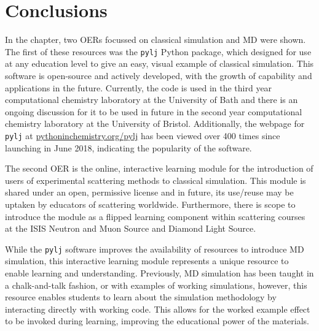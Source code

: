 \section{Conclusions}
In the chapter, two OERs focussed on classical simulation and MD were shown.
The first of these resources was the \texttt{pylj} Python package, which designed for use at any education level to give an easy, visual example of classical simulation.
This software is open-source and actively developed, with the growth of capability and applications in the future.
Currently, the code is used in the third year computational chemistry laboratory at the University of Bath and there is an ongoing discussion for it to be used in future in the second year computational chemistry laboratory at the University of Bristol.
Additionally, the webpage for \texttt{pylj} at \href{https://pythoninchemistry.org/pylj}{pythoninchemistry.org/pylj} has been viewed over 400 times since launching in June 2018, indicating the popularity of the software.

The second OER is the online, interactive learning module for the introduction of users of experimental scattering methods to classical simulation.
This module is shared under an open, permissive license and in future, its use/reuse may be uptaken by educators of scattering worldwide.
Furthermore, there is scope to introduce the module as a flipped learning component\autocite{noauthor_flipped_nodate} within scattering courses at the ISIS Neutron and Muon Source and Diamond Light Source.

While the \texttt{pylj} software improves the availability of resources to introduce MD simulation, this interactive learning module represents a unique resource to enable learning and understanding.
Previously, MD simulation has been taught in a chalk-and-talk fashion, or with examples of working simulations, however, this resource enables students to learn about the simulation methodology by interacting directly with working code.
This allows for the worked example effect to be invoked during learning, improving the educational power of the materials.
